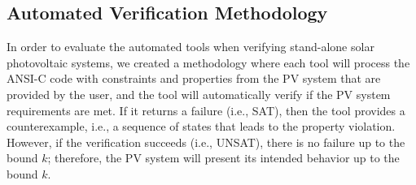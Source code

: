 \documentclass[runningheads]{llncs}
\begin{document}
\subsection{Automated Verification Methodology}
In order to evaluate the automated tools when verifying stand-alone solar photovoltaic systems, we created a methodology where each tool will process the ANSI-C code with constraints %
and properties %
from the PV system that are provided by the user, and the tool will automatically verify if the PV system requirements are met. If it returns a failure (i.e., SAT), then the tool provides a counterexample, i.e., a sequence of states that leads to the property violation. However, if the verification succeeds (i.e., UNSAT), there is no failure up to the bound $k$; therefore, the PV system will present its intended behavior up to the bound $k$.
\end{document}
